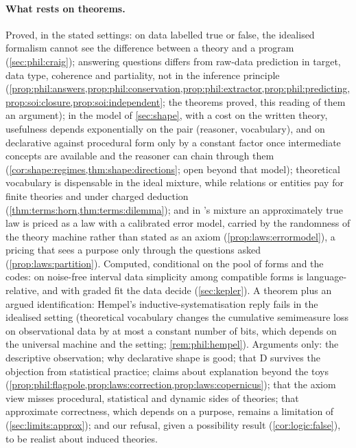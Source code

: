 \paragraph{What rests on theorems.}
Proved, in the stated settings: on data labelled true or false, the idealised formalism cannot see the difference between a theory and a program (\cref{sec:phil:craig}); answering questions differs from raw-data prediction in target, data type, coherence and partiality, not in the inference principle (\cref{prop:phil:answers,prop:phil:conservation,prop:phil:extractor,prop:phil:predicting,prop:soi:closure,prop:soi:independent}; the theorems proved, this reading of them an argument); in the model of \cref{sec:shape}, with a cost on the written theory, usefulness depends exponentially on the pair (reasoner, vocabulary), and on declarative against procedural form only by a constant factor once intermediate concepts are available and the reasoner can chain through them (\cref{cor:shape:regimes,thm:shape:directions}; open beyond that model); theoretical vocabulary is dispensable in the ideal mixture, while relations or entities pay for finite theories and under charged deduction (\cref{thm:terms:horn,thm:terms:dilemma}); and in \SAIabbr's mixture an approximately true law is priced as a law with a calibrated error model, carried by the randomness of the theory machine rather than stated as an axiom (\cref{prop:laws:errormodel}), a pricing that sees a purpose only through the questions asked (\cref{prop:laws:partition}). Computed, conditional on the pool of forms and the codes: on noise-free interval data simplicity among compatible forms is language-relative, and with graded fit the data decide (\cref{sec:kepler}). A theorem plus an argued identification: Hempel's inductive-systematisation reply fails in the idealised setting (theoretical vocabulary changes the cumulative semimeasure loss on observational data by at most a constant number of bits, which depends on the universal machine and the setting; \cref{rem:phil:hempel}). Arguments only: the descriptive observation; why declarative shape is good; that D survives the objection from statistical practice; claims about explanation beyond the toys (\cref{prop:phil:flagpole,prop:laws:correction,prop:laws:copernicus}); that the axiom view misses procedural, statistical and dynamic sides of theories; that approximate correctness, which depends on a purpose, remains a limitation of \SAIabbr (\cref{sec:limits:approx}); and our refusal, given a possibility result (\cref{cor:logic:false}), to be realist about induced theories.

